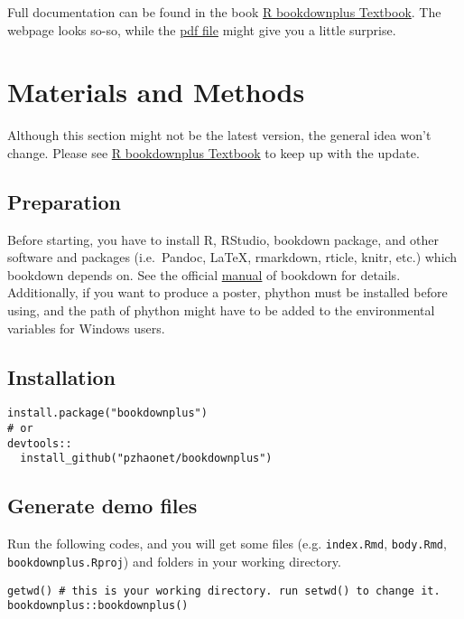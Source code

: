\documentclass[hess, online, hvmath]{style/copernicus}
\begin{document}
Full documentation can be found in the book
\href{https://bookdown.org/baydap/bookdownplus}{R bookdownplus
Textbook}. The webpage looks so-so, while the
\href{https://bookdown.org/baydap/bookdownplus/bookdownplus.pdf}{pdf
file} might give you a little surprise.

\section{Materials and Methods}\label{materials-and-methods}

Although this section might not be the latest version, the general idea
won't change. Please see
\href{https://bookdown.org/baydap/bookdownplus}{R bookdownplus Textbook}
to keep up with the update.

\subsection{Preparation}\label{preparation}

Before starting, you have to install R, RStudio, bookdown package, and
other software and packages (i.e.~Pandoc, LaTeX, rmarkdown, rticle,
knitr, etc.) which bookdown depends on. See the official
\href{https://bookdown.org/yihui/bookdown/}{manual} of bookdown for
details. Additionally, if you want to produce a poster, phython must be
installed before using, and the path of phython might have to be added
to the environmental variables for Windows users.

\subsection{Installation}\label{installation}

\begin{verbatim}
install.package("bookdownplus")
# or
devtools::
  install_github("pzhaonet/bookdownplus")
\end{verbatim}

\subsection{Generate demo files}\label{generate-demo-files}

Run the following codes, and you will get some files (e.g.
\texttt{index.Rmd}, \texttt{body.Rmd}, \texttt{bookdownplus.Rproj}) and
folders in your working directory.

\begin{verbatim}
getwd() # this is your working directory. run setwd() to change it.
bookdownplus::bookdownplus()
\end{verbatim}
\end{document}
